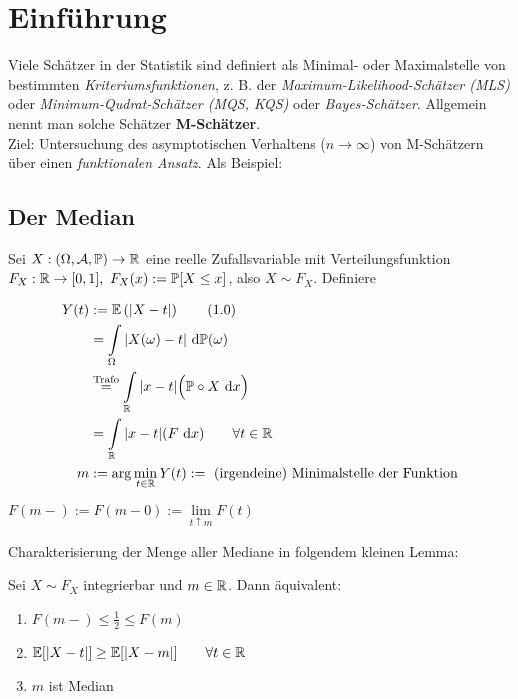 
\chapter{Einführung}
Viele Schätzer in der Statistik sind definiert als Minimal- oder Maximalstelle von bestimmten \textit{Kriteriumsfunktionen}, z. B. der \textit{Maximum-Likelihood-Schätzer (MLS)} oder \textit{Minimum-Qudrat-Schätzer (MQS, KQS)} oder \textit{Bayes-Schätzer}. Allgemein nennt man solche Schätzer \textbf{M-Schätzer}.\\
Ziel: Untersuchung des asymptotischen Verhaltens ($n\to\infty$) von M-Schätzern über einen \textit{funktionalen Ansatz}. Als Beispiel:

\section{Der Median}
Sei $X:(\Omega,\mathcal{A},\mathbb{P})\to\mathbb{R}$ eine reelle Zufallsvariable mit Verteilungsfunktion\\ $F_X:\mathbb{R}\to[0,1],~F_X(x):=\mathbb{P}[X\leq x]$, also $X\sim F_X$. Definiere

\begin{align}
Y(t)&:=\mathbb{E}\left(|X-t|\right)\label{DefY}\tag{1.0}\\ \nonumber
&=\int\limits_\Omega |X(\omega)-t|\text{ d}\mathbb{P}(\omega)\\ \nonumber
&\stackrel{\text{Trafo}}{=}
\int\limits_{\mathbb{R}}|x-t|\Big(\mathbb{P}\circ X\text{ d} x\Big)\\ \nonumber
&=\int\limits_{\mathbb{R}}|x-t|(F\text{ d} x) \nonumber
\qquad\forall t\in\mathbb{R}\\
m&:=\arg\min\limits_{t\in\mathbb{R}}Y(t):=\text{ (irgendeine) Minimalstelle der Funktion}\nonumber
\end{align} 

\begin{notation}
$F(m-):=F(m-0):=\lim\limits_{t\uparrow m} F(t)$
\end{notation}

Charakterisierung der Menge aller Mediane in folgendem kleinen Lemma:

\begin{lemma}\label{lemmaMedian}
Sei $X\sim F_X$ integrierbar und $m\in\mathbb{R}$. Dann äquivalent:
\begin{enumerate}[label=(\alph*)]
\item $F(m-)\leq\frac{1}{2}\leq F(m)$
\item $\mathbb{E}[|X-t|]\geq\mathbb{E}[|X-m|]\qquad\forall t\in\mathbb{R}$
\item $m$ ist Median
\end{enumerate}
\end{lemma}

